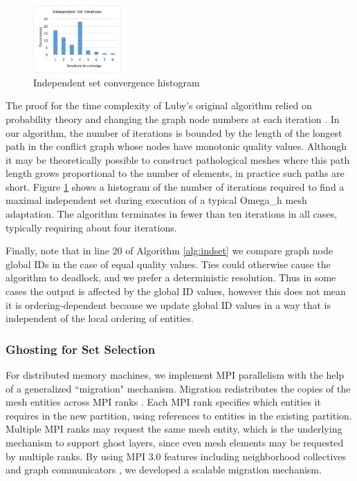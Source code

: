 \begin{figure}[t]\vspace*{4pt}
\centerline{\includegraphics[width=0.3\textwidth]{indset_iters.png}}
\caption{Independent set convergence histogram}\vspace*{-6pt}
\label{fig:indset_conv}
\end{figure}

The proof for the time complexity of Luby's original algorithm
relied on probability theory and changing
the graph node numbers at each iteration \cite{luby1986simple}.
In our algorithm, the number of iterations is bounded by the
length of the longest path in the conflict graph whose nodes have monotonic
quality values.
Although it may be theoretically possible to construct pathological
meshes where this path length grows proportional to the number of elements,
in practice such paths are short.
Figure \ref{fig:indset_conv} shows a histogram of the number of
iterations required to find a maximal independent set during execution
of a typical Omega\_h mesh adaptation.
The algorithm terminates in fewer than ten iterations in all cases,
typically requiring about four iterations.

Finally, note that in line 20 of Algorithm \ref{alg:indset} we
compare graph node global IDs in the case of equal quality values.
Ties could otherwise cause the algorithm to deadlock, and we
prefer a deterministic resolution.
Thus in some cases the output is affected by the global ID values,
however this does not mean it is ordering-dependent because
we update global ID values in a way that is independent
of the local ordering of entities.

\subsubsection{Ghosting for Set Selection}
\label{sec:indset_ghost}

For distributed memory machines, we implement MPI parallelism
with the help of a generalized ``migration" mechanism.
Migration redistributes the copies of the mesh entities
across MPI ranks \cite{ibanez2015pumi}.
Each MPI rank specifies which entities it requires in the new
partition, using references to entities in the existing
partition.
Multiple MPI ranks may request the same mesh entity, which
is the underlying mechanism to support ghost layers,
since even mesh elements may be requested by multiple ranks.
By using MPI 3.0 features including neighborhood collectives
\cite{hoefler2012optimization}
and graph communicators \cite{hoefler2011scalable},
we developed a scalable migration mechanism.

